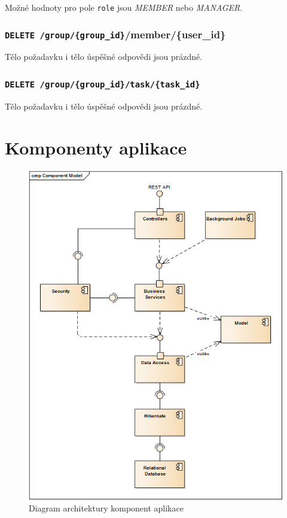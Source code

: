 \documentclass[thesis=B,czech]{FITthesis}[2012/06/26]
\begin{document}
			Možné hodnoty pro pole \texttt{role} jsou \textit{MEMBER} nebo \textit{MANAGER}.
		
		\subsection{\texttt{DELETE /group/\{group\_id\}}/member/\{user\_id\}}
			Tělo požadavku i tělo úspěšné odpovědi jsou prázdné.
		
		\subsection{\texttt{DELETE /group/\{group\_id\}/task/\{task\_id\}}}
			Tělo požadavku i tělo úspěšné odpovědi jsou prázdné.		
		
			
			
			
			
			
			
			
			
			
			
				\begin{description}
					\item[]
				\end{description}			

\chapter{Komponenty aplikace}
	\begin{figure}\centering
		\includegraphics[width=1\textwidth]{ea-diagrams/architecture-diagram.png}
		\caption[Diagram komponent]{Diagram architektury komponent aplikace}
		\label{diagram:component-model}
	\end{figure}
\end{document}
